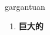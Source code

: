 
\begin{frame}
{\huge gargantuan}
\begin{center}
\begin{enumerate}\Large
  \item \textbf{巨大的}
\end{enumerate}
\end{center}
\end{frame}
